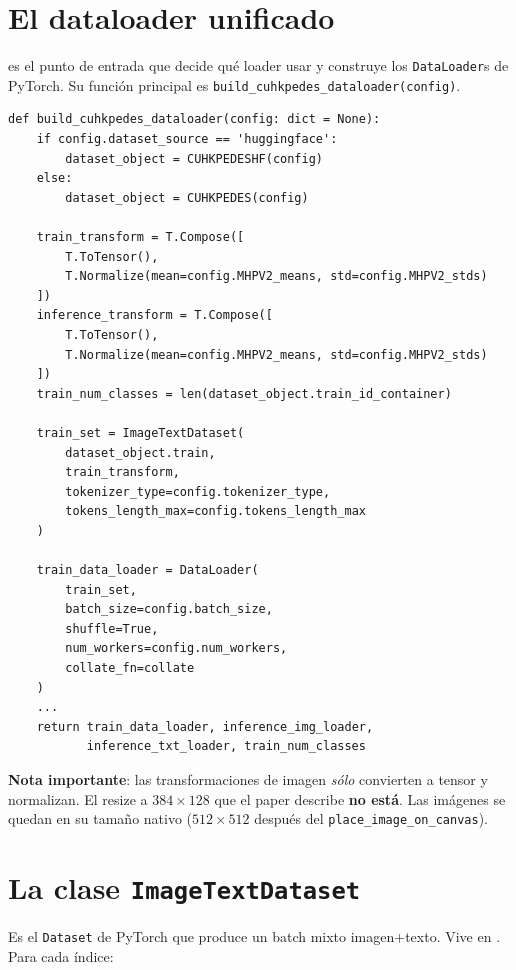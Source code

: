 \section{El dataloader unificado}

 es el punto de entrada
que decide qué loader usar y construye los \texttt{DataLoader}s
de PyTorch. Su función principal es
\texttt{build\_cuhkpedes\_dataloader(config)}.

\begin{verbatim}
def build_cuhkpedes_dataloader(config: dict = None):
    if config.dataset_source == 'huggingface':
        dataset_object = CUHKPEDESHF(config)
    else:
        dataset_object = CUHKPEDES(config)

    train_transform = T.Compose([
        T.ToTensor(),
        T.Normalize(mean=config.MHPV2_means, std=config.MHPV2_stds)
    ])
    inference_transform = T.Compose([
        T.ToTensor(),
        T.Normalize(mean=config.MHPV2_means, std=config.MHPV2_stds)
    ])
    train_num_classes = len(dataset_object.train_id_container)

    train_set = ImageTextDataset(
        dataset_object.train,
        train_transform,
        tokenizer_type=config.tokenizer_type,
        tokens_length_max=config.tokens_length_max
    )

    train_data_loader = DataLoader(
        train_set,
        batch_size=config.batch_size,
        shuffle=True,
        num_workers=config.num_workers,
        collate_fn=collate
    )
    ...
    return train_data_loader, inference_img_loader,
           inference_txt_loader, train_num_classes
\end{verbatim}

\noindent\textbf{Nota importante}: las transformaciones de
imagen \emph{sólo} convierten a tensor y normalizan. El resize a
$384 \times 128$ que el paper describe \textbf{no está}. Las
imágenes se quedan en su tamaño nativo ($512 \times 512$ después
del \texttt{place\_image\_on\_canvas}).

\section{La clase \texttt{ImageTextDataset}}

Es el \texttt{Dataset} de PyTorch que produce un batch mixto
imagen+texto. Vive en . Para cada índice:

